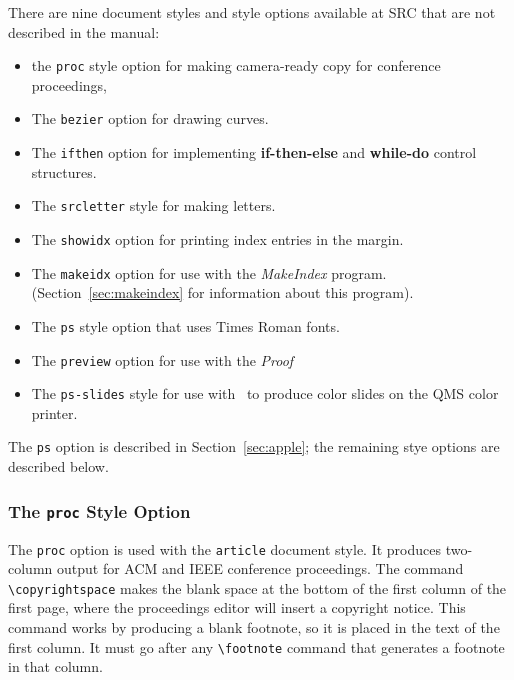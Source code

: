  
There are nine document styles and style options available at SRC that
are not described in the manual: 
\begin{itemize}
\item the \mbox{\tt proc} style option for making camera-ready copy for
conference proceedings,
 
\item The {\tt bezier} option for drawing curves.
 
\item The {\tt ifthen} option for implementing {\bf if-then-else} and
{\bf while-do} control structures.
 
\item The \mbox{\tt srcletter} style for making letters.
 
\item The {\tt showidx} option for printing index entries in the
margin.  
 
\item The {\tt makeidx} option for use with the {\it MakeIndex\/}
program. (Section~\ref{sec:makeindex} for information about this
program).
 
\item The {\tt ps} style option that uses Times Roman fonts.  
 
\item The {\tt preview} option for use with the {\em Proof\/}
 
\item The {{\tt ps-slides}} style for use with \SLiTeX\ to produce
color slides on the QMS color printer.
\end{itemize} 
The {\tt ps} option is described in Section~\ref{sec:apple}; the
remaining stye options are described below.
 
 
\subsubsection{The {\tt proc} Style Option}
 
The {\tt proc} option is used with the \mbox{\tt article} document
style.  It produces two-column output for ACM and IEEE conference
proceedings.  The command \hbox{\verb|\copyrightspace|} makes the blank
space at the bottom of the first column of the first page, where the
proceedings editor will insert a copyright notice.  This command works
by producing a blank footnote, so it is placed in the text of the first
column.  It must go after any \hbox{\verb|\footnote|} command that
generates a footnote in that column.
 
